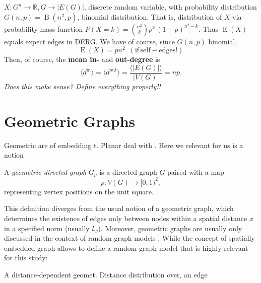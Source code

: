 		

\begin{remark}
  $X: G^n \to \mathbb{R}, G \to |E(G)|$, discrete random variable,
  with probability distribution $G(n,p) =\operatorname{B}(n^2,p)$,
  binomial distribution. That is, distribution of $X$ via probability
  mass function $P(X=k) = {{n^2} \choose k} p^k\,(1-p)^{n^2-k}$. Thus
  $\operatorname{E}(X)$ equals expect edges in DERG. We have of
  course, since $G(n,p)$ binomial,
  \[
  \operatorname{E}(X) = pn^2. \mathrm{\:(if\,self-edges!)}
  \]
  Then, of course, the \textbf{mean in-}  and \textbf{out-degree} is \[ \langle
  d^{\mathrm{in}} \rangle = \langle d^{\mathrm{out}} \rangle =
  \frac{\langle |E(G)| \rangle}{|V(G)|} = np.\] \textit{Does this make
    sense? Define everything properly!!}
\end{remark}




\section{Geometric Graphs}

Geometric are of embedding t. Planar deal with . Here we relevant for
us is a notion

\begin{definition} A \textit{geometric
    directed graph} $G_p$ is a directed graph $G$ paired with a map
\[
  p:V(G) \to [0,1)^2,
\]
representing vertex positions on the unit square.
\end{definition}

\begin{remark} This definition diverges from the usual notion of a
  geometric graph, which determines the existence of edges only
  between nodes within a spatial distance $x$ in a specified norm
  (usually $l_w$). Moreover, geometric graphs are usually only
  discussed in the context of random graph
  models \parencite{Gilbert1961}.  While the concept of spatially
  embedded graph allows to define a random graph model that is highly
  relevant for this study:
\end{remark}

\begin{definition}
A distance-dependent geomet. Distance distribution over, an edge 
\end{definition}


